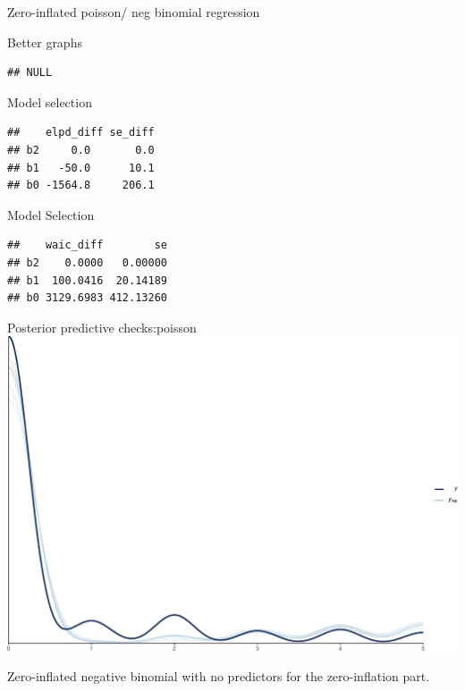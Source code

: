 \documentclass[
  ignorenonframetext,
]{beamer}
\begin{document}
\begin{frame}[fragile]{Zero-inflated poisson/ neg binomial regression}
\begin{block}{Better graphs}
\begin{verbatim}
## NULL
\end{verbatim}
\end{block}

\begin{block}{Model selection}
\protect\hypertarget{model-selection-1}{}
\begin{verbatim}
##    elpd_diff se_diff
## b2     0.0       0.0
## b1   -50.0      10.1
## b0 -1564.8     206.1
\end{verbatim}
\end{block}

\begin{block}{Model Selection}
\protect\hypertarget{model-selection-2}{}
\begin{verbatim}
##    waic_diff        se
## b2    0.0000   0.00000
## b1  100.0416  20.14189
## b0 3129.6983 412.13260
\end{verbatim}
\end{block}

\begin{block}{Posterior predictive checks:poisson}
\protect\hypertarget{posterior-predictive-checkspoisson}{}
\includegraphics{slides_files/figure-beamer/unnamed-chunk-68-1.pdf}

Zero-inflated negative binomial with no predictors for the
zero-inflation part.
\end{block}


\end{frame}
\end{document}
